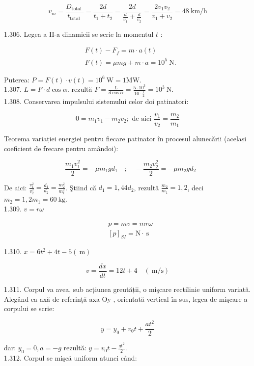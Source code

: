 \documentclass[10pt]{article}
\begin{document}
$$
v_{m}=\frac{D_{\text {total }}}{t_{\text {total }}}=\frac{2 d}{t_{1}+t_{2}}=\frac{2 d}{\frac{d}{v_{1}}+\frac{d}{v_{2}}}=\frac{2 v_{1} v_{2}}{v_{1}+v_{2}}=48 \mathrm{~km} / \mathrm{h}
$$

1.306. Legea a II-a dinamicii se scrie la momentul $t$ :

$$
\begin{aligned}
& F(t)-F_{f}=m \cdot a(t) \\
& F(t)=\mu m g+m \cdot a=10^{5} \mathrm{~N} .
\end{aligned}
$$

Puterea: $P=F(t) \cdot v(t)=10^{6} \mathrm{~W}=1 \mathrm{MW}$.\\
1.307. $L=F \cdot d \cos \alpha$. rezultă $F=\frac{L}{d \cos \alpha}=\frac{5 \cdot 10^{3}}{10 \cdot \frac{1}{2}}=10^{3} \mathrm{~N}$.\\
1.308. Conservarea impulsului sistemului celor doi patinatori:

$$
0=m_{1} v_{1}-m_{2} v_{2} ; \text { de aici } \frac{v_{1}}{v_{2}}=\frac{m_{2}}{m_{1}}
$$

Teorema variației energiei pentru fiecare patinator în procesul alunecării (același coeficient de frecare pentru amândoi):

$$
-\frac{m_{1} v_{1}^{2}}{2}=-\mu m_{1} g d_{1} \quad ; \quad-\frac{m_{2} v_{2}^{2}}{2}=-\mu m_{2} g d_{2}
$$

De aici: $\frac{v_{1}^{2}}{v_{2}^{2}}=\frac{d_{1}}{d_{2}}=\frac{m_{2}^{2}}{m_{1}^{2}}$. Ştiind că $d_{1}=1,44 d_{2}$, rezultă $\frac{m_{2}}{m_{1}}=1,2$, deci $m_{2}=1,2 m_{1}=60 \mathrm{~kg}$.\\
1.309. $v=r \omega$

$$
\begin{aligned}
& p=m v=m r \omega \\
& {[p]_{S I}=\mathrm{N} \cdot \mathrm{~s}}
\end{aligned}
$$

1.310. $x=6 t^{2}+4 t-5(\mathrm{~m})$

$$
v=\frac{d x}{d t}=12 t+4 \quad(\mathrm{~m} / \mathrm{s})
$$

1.311. Corpul va avea, sub acțiunea greutății, o mişcare rectilinie uniform variată. Alegând ca axă de referință axa Oy , orientată vertical în sus, legea de mişcare a corpului se scrie:

$$
y=y_{0}+v_{0} t+\frac{a t^{2}}{2}
$$

dar: $y_{0}=0, a=-g$ rezultă: $y=v_{0} t-\frac{g t^{2}}{2}$.\\
1.312. Corpul se mişcă uniform atunci când:
\end{document}
